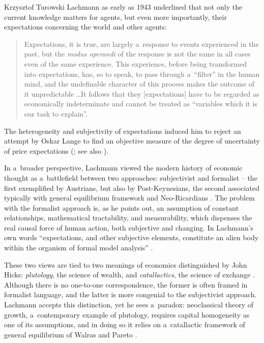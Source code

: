\begin{artengenv}{Krzysztof Turowski}
Lachmann as early as 1943 underlined that not only the current knowledge matters for agents, but even more importantly, their expectations concerning the world and other agents:
\begin{quote}
Expectations, it is true, are largely a~response to events experienced in the past, but the \emph{modus operandi} of the response is not the same in all cases even of the same experience. This experience, before being transformed into expectations, has, so to speak, to pass through a~``filter'' in the human mind, and the undefinable character of this process makes the outcome of it unpredictable \ldots It follows that they [expectations] have to be regarded as economically indeterminate and cannot be treated as ``variables which it is our task to explain''\cite[67]{lachmann-role-expectations}.
\end{quote}
The heterogeneity and subjectivity of expectations induced him to reject an attempt by Oskar Lange to find an objective measure of the degree of uncertainty of price expectations (\cite[120]{lachmann-expectations}; see also \cite[422]{van-zijp}).

In a~broader perspective, Lachmann viewed the modern history of economic thought as a~battlefield between two approaches: subjectivist and formalist -- the first exemplified by Austrians, but also by Post-Keynesians, the second associated typically with general equilibrium framework and Neo-Ricardians \parencite[22--23, 164]{lachmann1986market}.
The problem with the formalist approach is, as he points out, an assumption of constant relationships, mathematical tractability, and measurability, which dispenses the real causal force of human action, both subjective and changing.
In Lachmann's own words ``expectations, and other subjective elements, constitute an alien body within the organism of formal model analysis'' \parencite[249]{lachmann-hicks}.

These two views are tied to two meanings of economics distinguished by John Hicks: \emph{plutology}, the science of wealth, and \emph{catallactics}, the science of exchange \parencite[215]{hicks}.
Although there is no one-to-one correspondence, the former is often framed in formalist language, and the latter is more congenial to the subjectivist approach.
Lachmann accepts this distinction, yet he sees a~paradox: neoclassical theory of growth, a~contemporary example of plutology, requires capital homogeneity as one of its assumptions, and in doing so it relies on a~catallactic framework of general equilibrium of Walras and Pareto \parencite[25--26]{lachmann1986market}.


\end{artengenv}
